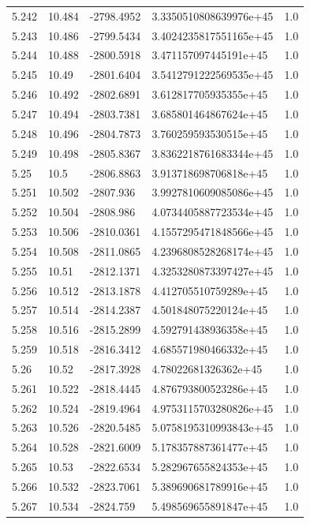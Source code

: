 \begin{tabular}{lllll}
5.242 & 10.484 & -2798.4952 & 3.3350510808639976e+45 & 1.0 \\
5.243 & 10.486 & -2799.5434 & 3.4024235817551165e+45 & 1.0 \\
5.244 & 10.488 & -2800.5918 & 3.471157097445191e+45 & 1.0 \\
5.245 & 10.49 & -2801.6404 & 3.5412791222569535e+45 & 1.0 \\
5.246 & 10.492 & -2802.6891 & 3.612817705935355e+45 & 1.0 \\
5.247 & 10.494 & -2803.7381 & 3.685801464867624e+45 & 1.0 \\
5.248 & 10.496 & -2804.7873 & 3.760259593530515e+45 & 1.0 \\
5.249 & 10.498 & -2805.8367 & 3.8362218761683344e+45 & 1.0 \\
5.25 & 10.5 & -2806.8863 & 3.913718698706818e+45 & 1.0 \\
5.251 & 10.502 & -2807.936 & 3.9927810609085086e+45 & 1.0 \\
5.252 & 10.504 & -2808.986 & 4.0734405887723534e+45 & 1.0 \\
5.253 & 10.506 & -2810.0361 & 4.1557295471848566e+45 & 1.0 \\
5.254 & 10.508 & -2811.0865 & 4.2396808528268174e+45 & 1.0 \\
5.255 & 10.51 & -2812.1371 & 4.3253280873397427e+45 & 1.0 \\
5.256 & 10.512 & -2813.1878 & 4.412705510759289e+45 & 1.0 \\
5.257 & 10.514 & -2814.2387 & 4.501848075220124e+45 & 1.0 \\
5.258 & 10.516 & -2815.2899 & 4.592791438936358e+45 & 1.0 \\
5.259 & 10.518 & -2816.3412 & 4.685571980466332e+45 & 1.0 \\
5.26 & 10.52 & -2817.3928 & 4.78022681326362e+45 & 1.0 \\
5.261 & 10.522 & -2818.4445 & 4.876793800523286e+45 & 1.0 \\
5.262 & 10.524 & -2819.4964 & 4.9753115703280826e+45 & 1.0 \\
5.263 & 10.526 & -2820.5485 & 5.0758195310993843e+45 & 1.0 \\
5.264 & 10.528 & -2821.6009 & 5.178357887361477e+45 & 1.0 \\
5.265 & 10.53 & -2822.6534 & 5.282967655824353e+45 & 1.0 \\
5.266 & 10.532 & -2823.7061 & 5.389690681789916e+45 & 1.0 \\
5.267 & 10.534 & -2824.759 & 5.498569655891847e+45 & 1.0 \\

\end{tabular}
